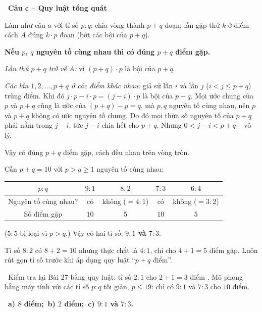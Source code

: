 \documentclass[11pt]{article}
\providecommand{\AnsWord}{Đáp số}
\newcommand{\ans}[1]{\par\smallskip{\bfseries\color{tmGreen!88!black}\AnsWord:}\ {\bfseries\color{AnsRed}#1}\par}
\newcommand{\step}[2]{\par\smallskip\noindent{\bfseries\color{tmBlue!85!black}\StepWord~#1.}\ {\bfseries #2}\par\nopagebreak}
\newcommand{\verify}[1]{\par\smallskip\noindent{\bfseries\color{tmGreen!80!black}\faCheckCircle\ \CheckWord}\ #1\par}
\def\AnsWord{Đáp số}
\def\StepWord{Bước}
\def\CheckWord{Thử lại:}
\begin{document}
{\step{3}{Câu c -- Quy luật tổng quát}
Làm như câu a với tỉ số $p:q$: chia vòng thành $p+q$ đoạn; lần gặp thứ $k$ ở điểm cách $A$ đúng $k\cdot p$ đoạn (bớt các bội của $p+q$).
\begin{proofbox}\textbf{Nếu $p$, $q$ nguyên tố cùng nhau thì có đúng $p+q$ điểm gặp.}\par
\emph{Lần thứ $p+q$ trở về $A$:} vì $(p+q)\cdot p$ là bội của $p+q$.\par
\emph{Các lần $1,2,\dots,p+q$ ở các điểm khác nhau:} giả sử lần $i$ và lần $j$ ($i<j\le p+q$) trùng điểm. Khi đó $j\cdot p-i\cdot p=(j-i)\cdot p$ là bội của $p+q$. Mọi ước chung của $p$ và $p+q$ cũng là ước của $(p+q)-p=q$, mà $p,q$ nguyên tố cùng nhau, nên $p$ và $p+q$ không có ước nguyên tố chung. Do đó mọi thừa số nguyên tố của $p+q$ phải nằm trong $j-i$, tức $j-i$ chia hết cho $p+q$. Nhưng $0<j-i<p+q$ -- vô lý.\par
Vậy có đúng $p+q$ điểm gặp, cách đều nhau trên vòng tròn.\end{proofbox}
Cần $p+q=10$ với $p>q\ge 1$ nguyên tố cùng nhau:
\begin{center}
\begin{tabular}{|c|c|c|c|c|}
\hline
\rowcolor{tmBlue!10}$p:q$ & $9:1$ & $8:2$ & $7:3$ & $6:4$\\ \hline
Nguyên tố cùng nhau? & có & không ($=4:1$) & có & không ($=3:2$)\\ \hline
Số điểm gặp & $10$ & $5$ & $10$ & $5$\\ \hline
\end{tabular}
\end{center}
($5:5$ bị loại vì $p>q$.) Vậy có hai tỉ số: \textbf{$9:1$ và $7:3$}.
\begin{warnbox}Tỉ số $8:2$ có $8+2=10$ nhưng thực chất là $4:1$, chỉ cho $4+1=5$ điểm gặp. Luôn rút gọn tỉ số trước khi áp dụng quy luật ``$p+q$ điểm''.\end{warnbox}
\verify{Kiểm tra lại Bài 27 bằng quy luật: tỉ số $2:1$ cho $2+1=3$ điểm \checkmark. Mô phỏng bằng máy tính với các tỉ số $p:q$ tối giản, $p\le 19$: chỉ có $9:1$ và $7:3$ cho $10$ điểm.}
\ans{a) $8$ điểm;\ b) $2$ điểm;\ c) $9:1$ và $7:3$.}
}
\end{document}
